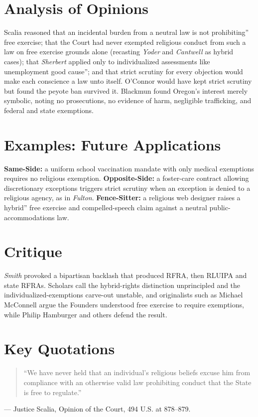 \documentclass[12pt]{article}
\begin{document}
\section{Analysis of Opinions}
Scalia reasoned that an incidental burden from a neutral law is not prohibiting'' free exercise; that the Court had never exempted religious conduct from such a law on free exercise grounds alone (recasting \textit{Yoder} and \textit{Cantwell} as hybrid cases); that \textit{Sherbert} applied only to individualized assessments like unemployment good cause''; and that strict scrutiny for every objection would make each conscience a law unto itself. O'Connor would have kept strict scrutiny but found the peyote ban survived it. Blackmun found Oregon's interest merely symbolic, noting no prosecutions, no evidence of harm, negligible trafficking, and federal and state exemptions.

\section{Examples: Future Applications}
\textbf{Same-Side:} a uniform school vaccination mandate with only medical exemptions requires no religious exemption. \textbf{Opposite-Side:} a foster-care contract allowing discretionary exceptions triggers strict scrutiny when an exception is denied to a religious agency, as in \textit{Fulton}. \textbf{Fence-Sitter:} a religious web designer raises a hybrid'' free exercise and compelled-speech claim against a neutral public-accommodations law.

\section{Critique}
\textit{Smith} provoked a bipartisan backlash that produced RFRA, then RLUIPA and state RFRAs. Scholars call the hybrid-rights distinction unprincipled and the individualized-exemptions carve-out unstable, and originalists such as Michael McConnell argue the Founders understood free exercise to require exemptions, while Philip Hamburger and others defend the result.

\section{Key Quotations}
\begin{quote}
``We have never held that an individual's religious beliefs excuse him from compliance with an otherwise valid law prohibiting conduct that the State is free to regulate.''
\end{quote}
\noindent --- Justice Scalia, Opinion of the Court, 494 U.S. at 878--879.
\end{document}
